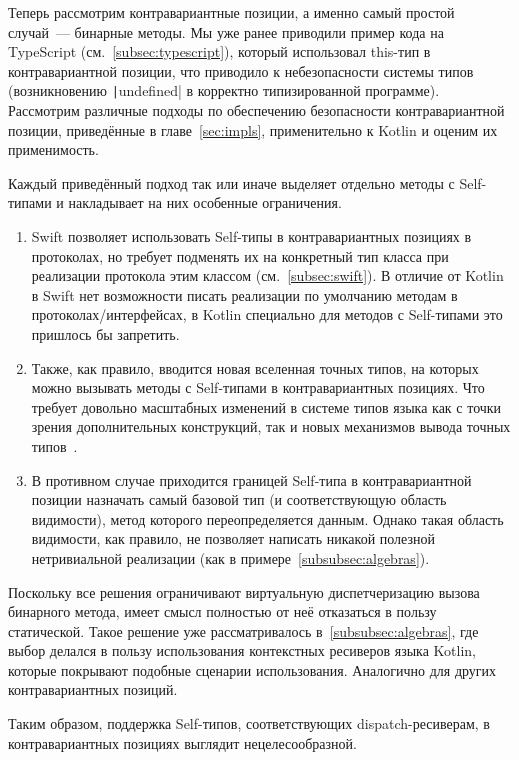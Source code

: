 Теперь рассмотрим контравариантные позиции, а именно самый простой случай~--- бинарные методы.
Мы уже ранее приводили пример кода на TypeScript (см.~\ref{subsec:typescript}), который использовал this-тип в контравариантной позиции, что приводило к небезопасности системы типов (возникновению \texttt|undefined| в корректно типизированной программе).
Рассмотрим различные подходы по обеспечению безопасности контравариантной позиции, приведённые в главе~\ref{sec:impls}, применительно к Kotlin и оценим их применимость.

Каждый приведённый подход так или иначе выделяет отдельно методы с Self-типами и накладывает на них особенные ограничения.

\begin{enumerate}
    \item Swift позволяет использовать Self-типы в контравариантных позициях в протоколах, но требует подменять их на конкретный тип класса при реализации протокола этим классом (см.~\ref{subsec:swift}).
    В отличие от Kotlin в Swift нет возможности писать реализации по умолчанию методам в протоколах/интерфейсах, в Kotlin специально для методов с Self-типами это пришлось бы запретить.
    \item Также, как правило, вводится новая вселенная точных типов, на которых можно вызывать методы с Self-типами в контравариантных позициях.
    Что требует довольно масштабных изменений в системе типов языка как с точки зрения дополнительных конструкций, так и новых механизмов вывода точных типов~\cite{ryu2016thistype}.
    \item В противном случае приходится границей Self-типа в контравариантной позиции назначать самый базовой тип (и соответствующую область видимости), метод которого переопределяется данным.
    Однако такая область видимости, как правило, не позволяет написать никакой полезной нетривиальной реализации (как в примере~\ref{subsubsec:algebras}).
\end{enumerate}

Поскольку все решения ограничивают виртуальную диспетчеризацию вызова бинарного метода, имеет смысл полностью от неё отказаться в пользу статической.
Такое решение уже рассматривалось в~\ref{subsubsec:algebras}, где выбор делался в пользу использования контекстных ресиверов языка Kotlin, которые покрывают подобные сценарии использования.
Аналогично для других контравариантных позиций.

Таким образом, поддержка Self-типов, соответствующих dispatch-ресиверам, в контравариантных позициях выглядит нецелесообразной.

